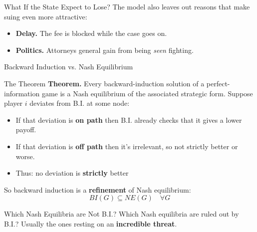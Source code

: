 \begin{frame}{What If the State Expect to Lose?}
The model also leaves out reasons that make suing even more attractive:
\begin{itemize}
    \item \textbf{Delay.} The fee is blocked while the case goes on.
    \item \textbf{Politics.} Attorneys general gain from being \textit{seen} fighting.
\end{itemize}
\end{frame}


\begin{frame}[standout]
Backward Induction vs. Nash Equilibrium
\end{frame}

\begin{frame}{The Theorem}
\textbf{Theorem.} Every backward-induction solution of a perfect-information game is a
Nash equilibrium of the associated strategic form.
\vfill
Suppose player $i$ deviates from B.I. at some node:
\begin{itemize}
    \item If that deviation is \textbf{on path} then B.I. already checks that it gives a lower payoff.
    \item If that deviation is \textbf{off path} then it's irrelevant, so not strictly better or worse.
    \item Thus: no deviation is \textbf{strictly} better
\end{itemize}
\vfill
So backward induction is a \textbf{refinement} of Nash equilibrium: $$BI(G)\subseteq NE(G)\quad \forall G$$
\vspace{-0.3in}
\end{frame}

\begin{frame}{Which Nash Equilibria are Not B.I.?}
Which Nash equilibria are ruled out by B.I.?
\vfill
\centering
\large
Usually the ones resting on an \textbf{incredible threat}.
\vfill
\normalsize
\raggedright
\vspace{1.2in}
\end{frame}

